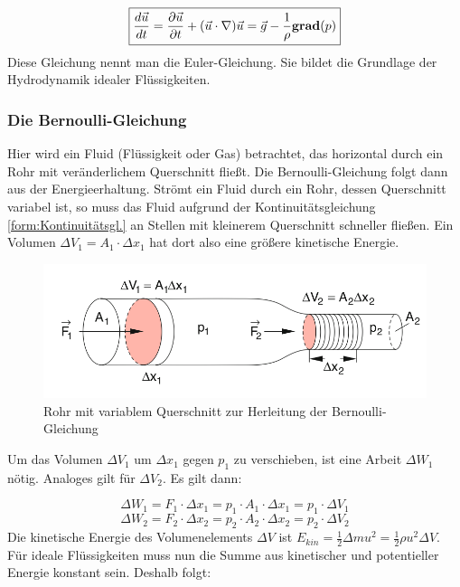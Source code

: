 \begin{equation}
\boxed{\frac{d \vec{u}}{dt} = \frac{\partial \vec{u}}{\partial t} + (\vec{u} \cdot \nabla) \vec{u} = \vec{g} - \frac{1}{\rho} {\bf grad} (p)}
\end{equation}
Diese Gleichung nennt man die Euler-Gleichung. Sie bildet die Grundlage der Hydrodynamik idealer Flüssigkeiten.

\subsubsection{Die Bernoulli-Gleichung}
Hier wird ein Fluid (Flüssigkeit oder Gas) betrachtet, das horizontal durch ein Rohr mit veränderlichem Querschnitt fließt. Die Bernoulli-Gleichung folgt dann aus der Energieerhaltung. Strömt ein Fluid durch ein Rohr, dessen Querschnitt variabel ist, so muss das Fluid aufgrund der Kontinuitätsgleichung \ref{form:Kontinuitätsgl.} an Stellen mit kleinerem Querschnitt schneller fließen. Ein Volumen $ \Delta V_1 = A_1 \cdot \Delta x_1 $ hat dort also eine größere kinetische Energie.

\begin{figure}
        \includegraphics[width=.9\textwidth]{images/8-8}
\caption{ Rohr mit variablem Querschnitt zur Herleitung der Bernoulli-Gleichung }
\label{fig:8-8}
\end{figure}

Um das Volumen $ \Delta V_1 $ um $ \Delta x_1 $ gegen $ p_1 $ zu verschieben, ist eine Arbeit $ \Delta W_1 $ nötig. Analoges gilt für $ \Delta V_2 $. Es gilt dann:

\begin{equation}
\Delta W_1 = F_1 \cdot \Delta x_1 = p_1 \cdot A_1 \cdot \Delta x_1 = p_1 \cdot \Delta V_1
\end{equation}
\begin{equation}
\Delta W_2 = F_2 \cdot \Delta x_2 = p_2 \cdot A_2 \cdot \Delta x_2 = p_2 \cdot \Delta V_2
\end{equation}
Die kinetische Energie des Volumenelements $ \Delta V $ ist $ E_{kin} = \frac{1}{2} \Delta m u^2 = \frac{1}{2} \rho u^2 \Delta V $. Für ideale Flüssigkeiten muss nun die Summe aus kinetischer und potentieller Energie konstant sein. Deshalb folgt:

